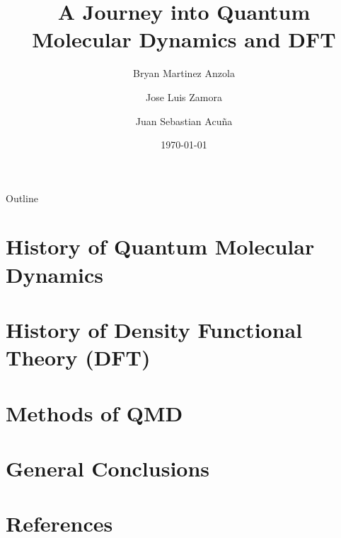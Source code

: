 \documentclass{beamer}
\title[QMD \& DFT]{A Journey into Quantum Molecular Dynamics and DFT}
\author{Bryan Martinez Anzola \and Jose Luis Zamora \and Juan Sebastian Acuña}
\institute{Universidad Distrital Francisco José de Caldas}
\date{\today}
\begin{document}
\begin{frame}
    \titlepage
    
\end{frame}

\begin{frame}{Outline}
    \tableofcontents
\end{frame}


\section{History of Quantum Molecular Dynamics}


\section{History of Density Functional Theory (DFT)}


\section{Methods of QMD}


\section{General Conclusions}


\section{References}

\end{document}
